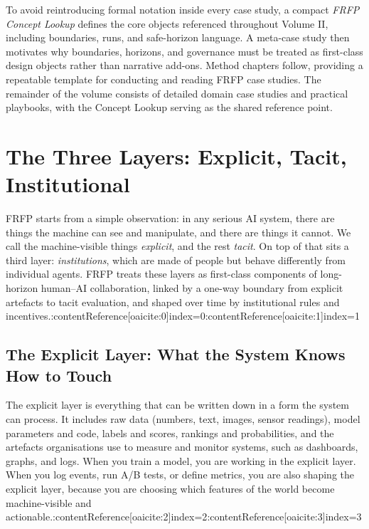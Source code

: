 To avoid reintroducing formal notation inside every case study, a compact \emph{FRFP Concept Lookup} defines the core objects referenced throughout Volume II, including boundaries, runs, and safe-horizon language. A meta-case study then motivates why boundaries, horizons, and governance must be treated as first-class design objects rather than narrative add-ons. Method chapters follow, providing a repeatable template for conducting and reading FRFP case studies. The remainder of the volume consists of detailed domain case studies and practical playbooks, with the Concept Lookup serving as the shared reference point.


\clearpage
\chapter{The Three Layers: Explicit, Tacit, Institutional}

FRFP starts from a simple observation: in any serious AI system, there are things the machine can see and manipulate, and there are things it cannot. We call the machine-visible things \emph{explicit}, and the rest \emph{tacit}. On top of that sits a third layer: \emph{institutions}, which are made of people but behave differently from individual agents. FRFP treats these layers as first-class components of long-horizon human--AI collaboration, linked by a one-way boundary from explicit artefacts to tacit evaluation, and shaped over time by institutional rules and incentives.:contentReference[oaicite:0]{index=0}:contentReference[oaicite:1]{index=1}

\section{The Explicit Layer: What the System Knows How to Touch}

The explicit layer is everything that can be written down in a form the system can process. It includes raw data (numbers, text, images, sensor readings), model parameters and code, labels and scores, rankings and probabilities, and the artefacts organisations use to measure and monitor systems, such as dashboards, graphs, and logs. When you train a model, you are working in the explicit layer. When you log events, run A/B tests, or define metrics, you are also shaping the explicit layer, because you are choosing which features of the world become machine-visible and actionable.:contentReference[oaicite:2]{index=2}:contentReference[oaicite:3]{index=3}


